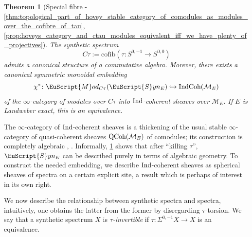 \documentclass[oneside,a4paper]{amsart}
\newcommand{\euscr}[1]{\EuScript{#1}} %
\newcommand{\IndCoh}{\textnormal{IndCoh}} %
\newcommand{\Ind}{\textnormal{Ind}} %
\newcommand{\QCoh}{\textnormal{QCoh}} %
\newcommand{\synspectra}{\euscr{S}yn} %
\newcommand{\Mod}{\euscr{M}od} %
\theoremstyle{plain}
\newtheorem{thm}{Theorem}[section]
\theoremstyle{definition}
\theoremstyle{remark}
\begin{document}
\begin{thm}[Special fibre - \ref{thm:topological_part_of_hovey_stable_category_of_comodules_as_modules_over_the_cofibre_of_tau}, \ref{prop:hoveys_category_and_ctau_modules_equivalent_iff_we_have_plenty_of_projectives}] 
\label{thm:introduction_modules_over_ctau_embeding_into_hoveys_stable_category}
The synthetic spectrum
\[
C\tau := \mathrm{cofib}(\tau \colon S^{0, -1} \rightarrow S^{0, 0})
\]
admits a canonical structure of a commutative algebra. Morever, there exists a canonical symmetric monoidal embedding 
\[
\chi^{*} \colon \Mod_{C\tau}(\synspectra_{E}) \hookrightarrow \IndCoh(\mathcal{M}_{E})
\]
of the $\infty$-category of modules over $C\tau$  into $\Ind$-coherent sheaves over $\mathcal{M}_{E}$. If $E$ is Landweber exact, this is an equivalence. 
\end{thm}
The $\infty$-category of $\Ind$-coherent sheaves is a thickening of the usual stable $\infty$-category of quasi-coherent sheaves $\QCoh(\mathcal{M}_{E})$ of comodules; its construction is completely algebraic \cite{hovey2003homotopy}, \cite{barthel2015local}. Informally, \cref{thm:introduction_modules_over_ctau_embeding_into_hoveys_stable_category} 
shows that after ``killing $\tau$'', $\synspectra_{E}$ can be described purely in terms of algebraic geometry. To construct the needed embedding, we describe $\Ind$-coherent sheaves as spherical sheaves of spectra on a certain explicit site, a result which is perhaps of interest in its own right.

We now describe the relationship between synthetic spectra and spectra, intuitively, one obtains the latter from the former by disregarding $\tau$-torsion. We say that a synthetic spectrum $X$ is \emph{$\tau$-invertible} if $\tau \colon \Sigma^{0, -1} X \rightarrow X$ is an equivalence.
\end{document}
